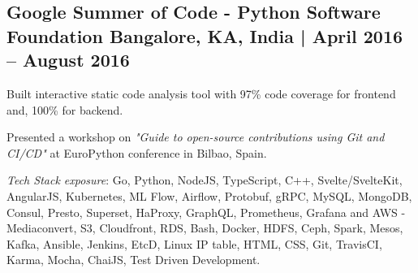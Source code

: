 \subsection{{Google Summer of Code - Python Software Foundation \hfill Bangalore, KA, India | April 2016 -- August 2016}}
\begin{zitemize}
\item Built interactive static code analysis tool with 97\% code coverage for frontend and, 100\% for backend.
\item Presented a workshop on \textit{"Guide to open-source contributions using Git and CI/CD"} at EuroPython conference in Bilbao, Spain.
\end{zitemize}

\textit{Tech Stack exposure}: Go, Python, NodeJS, TypeScript, C++, Svelte/SvelteKit, AngularJS, Kubernetes, ML Flow, Airflow, Protobuf, gRPC, 
MySQL, MongoDB, Consul, Presto, Superset, HaProxy, GraphQL, Prometheus, Grafana and AWS - Mediaconvert, S3, Cloudfront, RDS, Bash, Docker, 
HDFS, Ceph, Spark, Mesos, Kafka, Ansible, Jenkins, EtcD, Linux IP table, HTML, CSS, Git, TravisCI, Karma, Mocha, ChaiJS, Test Driven Development.